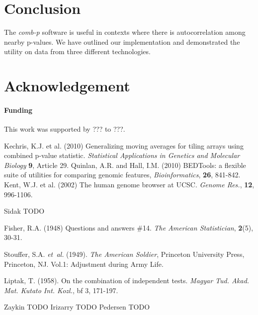 \documentclass{bioinfo}
\begin{document}
\section{Conclusion}
The \textit{comb-p} software is useful in contexts where there is
autocorrelation among nearby p-values. We have outlined our implementation
and demonstrated the utility on data from three different technologies.

\section*{Acknowledgement}

\paragraph{Funding\textcolon} This work was supported by ??? to ???.

%
%
%
%
%

%

%
\begin{thebibliography}{}
 Kechris, K.J. et al. (2010)
Generalizing moving averages for tiling arrays using combined p-value
statistic. {\it Statistical Applications in Genetics and Molecular Biology}
{\bf 9}, Article 29.
 Quinlan, A.R. and Hall, I.M. (2010) BEDTools: a flexible suite of utilities for comparing genomic features, {\it Bioinformatics}, {\bf 26}, 841-842.
 Kent, W.J. et al. (2002) The human genome browser at UCSC. {\it Genome Res.}, {\bf 12}, 996-1106.

 Sidak TODO

Fisher, R.A. (1948)
Questions and answers \#14.
{\it The American Statistician}, {\bf 2}(5), 30-31.

Stouffer, S.A. \textit{et~al.} (1949). \textit{The American Soldier},
Princeton University Press, Princeton, NJ. Vol.1: Adjustment during Army Life.

Liptak, T. (1958). On the combination of independent tests. {\it Magyar Tud. Akad. Mat. Kutato Int. Kozl.}, {bf 3}, 171-197.

 Zaykin TODO
 Irizarry TODO
 Pedersen TODO

\end{thebibliography}
\end{document}
